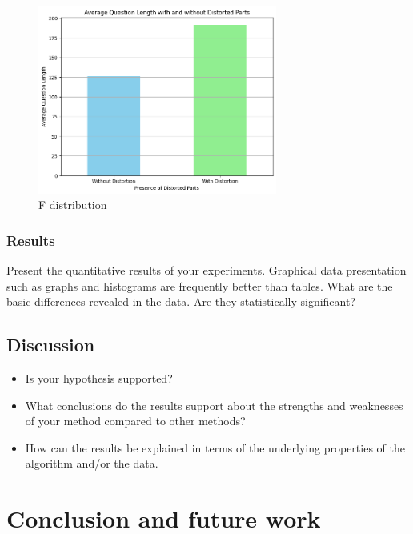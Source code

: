 \documentclass[runningheads,a4paper,11pt]{report}
\begin{document}
\begin{figure}[htbp!]
\centering
\includegraphics[width=0.7\textwidth]{pictures/avg_question_len.png}
\caption{F distribution}
\label{fig:avg_question_len}                                
\end{figure}

\subsection{Results}
\label{section:results}

Present the quantitative results of your experiments. Graphical data presentation such as graphs and histograms are frequently better than tables. What are the basic differences revealed in the data. Are they statistically significant?

\section{Discussion}
\label{section:discussion}

\begin{itemize}
	\item Is your hypothesis supported? 
	\item What conclusions do the results support about the strengths and weaknesses of your method compared to other methods? 
	\item How can the results be explained in terms of the underlying properties of the algorithm and/or the data. 
\end{itemize}




\chapter{Conclusion and future work}
\label{chapter:concl}
\end{document}
